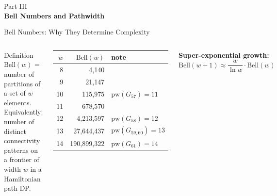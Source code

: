 \documentclass[aspectratio=169,t]{beamer}
\newcommand{\pw}{\mathrm{pw}}
\newcommand{\Bell}{\mathrm{Bell}}
\begin{document}
{
\begin{frame}[plain]
  \vspace{2cm}
  \begin{center}
    {\color{lightblue}\small Part III}\\[0.4cm]
    {\color{white}\LARGE\bfseries Bell Numbers and Pathwidth}
  \end{center}
\end{frame}
}

\begin{frame}{Bell Numbers: Why They Determine Complexity}
\small
\begin{columns}[c]
\begin{block}{Definition}
$\Bell(w)$ = number of partitions of a set of $w$ elements.\\[3pt]
Equivalently: number of distinct connectivity patterns
on a frontier of width $w$ in a Hamiltonian path DP.
\end{block}

\vspace{0.2cm}
\begin{center}
\begin{tabular}{rr@{\hskip 8pt}l}
\toprule
$w$ & $\Bell(w)$ & note \\
\midrule
 8 &          4{,}140 & \\
 9 &         21{,}147 & \\
10 &        115{,}975 & $\pw(G_{57}) = 11$ \\
11 &        678{,}570 & \\
12 &      4{,}213{,}597 & $\pw(G_{58}) = 12$ \\
13 &     27{,}644{,}437 & $\pw(G_{59,60}) = 13$ \\
\rowcolor{accent!10}
14 & 190{,}899{,}322 & $\pw(G_{61}) = 14$ \\
\bottomrule
\end{tabular}
\end{center}

\textbf{Super-exponential growth:}
\[
  \Bell(w+1) \approx \frac{w}{\ln w} \cdot \Bell(w)
\]

\vspace{0.1cm}
\begin{center}
\end{center}


\end{columns}
\end{frame}
\end{document}
